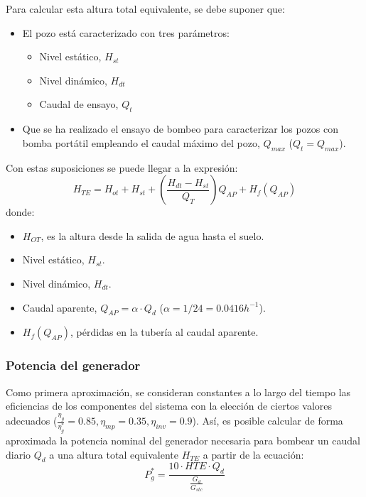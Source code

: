 Para calcular esta altura total equivalente, se debe suponer que:
\begin{itemize}
\item El pozo está caracterizado con tres parámetros:
\begin{itemize}
\item Nivel estático, \(H_{st}\)
\item Nivel dinámico, \(H_{dt}\)
\item Caudal de ensayo, \(Q_t\) 
\end{itemize}
\item Que se ha realizado el ensayo de bombeo para caracterizar los pozos con bomba portátil empleando el caudal máximo del pozo, \(Q_{max}\) (\(Q_t=Q_{max}\)).
\end{itemize}

Con estas suposiciones se puede llegar a la expresión:
\begin{equation}
H_{TE} = H_{ot} + H_{st} + \left( \frac{H_{dt} - H_{st}}{Q_T} \right) Q_{AP} + H_f(Q_{AP})
\end{equation}
donde:
\begin{itemize}
\item \(H_{OT}\), es la altura desde la salida de agua hasta el suelo.
\item Nivel estático, \(H_{st}\).
\item Nivel dinámico, \(H_{dt}\).
\item Caudal aparente, \(Q_{AP} = \alpha \cdot Q_d\)
(\(\alpha=1/24=0.0416h^{-1}\)).
\item \(H_f(Q_{AP})\), pérdidas en la tubería al caudal aparente.
\end{itemize}

\subsubsection{Potencia del generador}
\label{sec:orga22ff8c}
Como primera aproximación, se consideran constantes a lo largo del tiempo las eficiencias de los componentes del sistema con la elección de ciertos valores adecuados (\(\frac{\eta_g}{\eta_g^*}=0.85, \eta_{mp}=0.35, \eta_{inv}=0.9\)). Así, es posible calcular de forma aproximada la potencia nominal del generador necesaria para bombear un caudal diario \(Q_d\) a una altura total equivalente \(H_{TE}\) a partir de la ecuación:
\begin{equation}
P^*_g = \frac{10 \cdot HTE \cdot Q_d}{\frac{G_d}{G_{stc}}}
\end{equation}

